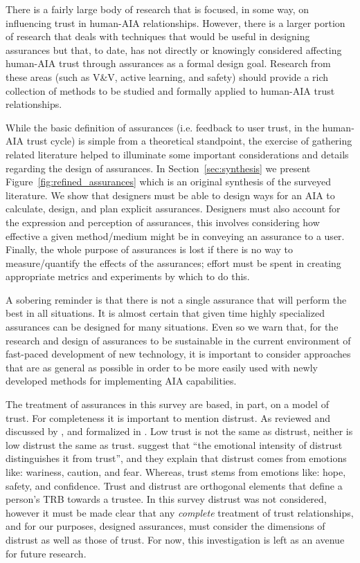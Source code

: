     There is a fairly large body of research that is focused, in some way, on influencing trust in human-AIA relationships. However, there is a larger portion of research that deals with techniques that would be useful in designing assurances but that, to date, has not directly or knowingly considered affecting human-AIA trust through assurances as a formal design goal. Research from these areas (such as V\&V, active learning, and safety) should provide a rich collection of methods to be studied and formally applied to human-AIA trust relationships.

    While the basic definition of assurances (i.e. feedback to user trust, in the human-AIA trust cycle) is simple from a theoretical standpoint, the exercise of gathering related literature helped to illuminate some important considerations and details regarding the design of assurances. In Section~\ref{sec:synthesis} we present Figure~\ref{fig:refined_assurances} which is an original synthesis of the surveyed literature. We show that designers must be able to design ways for an AIA to calculate, design, and plan explicit assurances. Designers must also account for the expression and perception of assurances, this involves considering how effective a given method/medium might be in conveying an assurance to a user. Finally, the whole purpose of assurances is lost if there is no way to measure/quantify the effects of the assurances; effort must be spent in creating appropriate metrics and experiments by which to do this.

    A sobering reminder is that there is not a single assurance that will perform the best in all situations. It is almost certain that given time highly specialized assurances can be designed for many situations. Even so we warn that, for the research and design of assurances to be sustainable in the current environment of fast-paced development of new technology, it is important to consider approaches that are as general as possible in order to be more easily used with newly developed methods for implementing AIA capabilities.

    The treatment of assurances in this survey are based, in part, on a model of trust. For completeness it is important to mention distrust. As reviewed and discussed by \citet{Lewicki1998-ox}, and formalized in \cite{McKnight2001-hm,McKnight2001-gz}. Low trust is not the same as distrust, neither is low distrust the same as trust. \citet{McKnight2001-gz} suggest that ``the emotional intensity of distrust distinguishes it from trust'', and they explain that distrust comes from emotions like: wariness, caution, and fear. Whereas, trust stems from emotions like: hope, safety, and confidence. Trust and distrust are orthogonal elements that define a person's TRB towards a trustee. In this survey distrust was not considered, however it must be made clear that any \emph{complete} treatment of trust relationships, and for our purposes, designed assurances, must consider the dimensions of distrust as well as those of trust. For now, this investigation is left as an avenue for future research.

